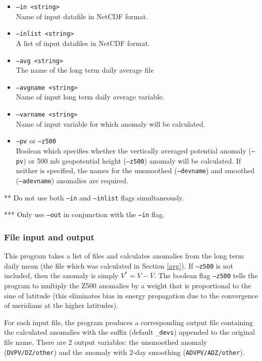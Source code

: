 \documentclass{article}
\begin{document}
\begin{itemize}
\item[]\texttt{--in <string>}\\ Name of input datafile in NetCDF format.
\item[]\texttt{--inlist <string>} \\ A list of input datafiles in NetCDF format. 
\item[] \texttt{--avg <string>}\\ The name of the long term daily average file 
\item[]\texttt{--avgname <string>}\\Name of input long term daily average variable.
\item[] \texttt{--varname <string>}\\Name of input variable for which anomaly will be calculated.
\item[]\texttt{--pv} or \texttt{--z500}\\Boolean which specifies whether the vertically averaged potential anomaly (\texttt{--pv}) or 500 mb geopotential height (\texttt{--z500}) anomaly will be calculated. If neither is specified, the names for the unsmoothed (\texttt{--devname}) and smoothed (\texttt{--adevname}) anomalies are required.
\end{itemize}

** Do not use both \texttt{--in} and \texttt{--inlist} flags simultaneously.

*** Only use \texttt{--out} in conjunction with the \texttt{--in} flag.

\subsubsection{File input and output}
This program takes a list of files and calculates anomalies from the long term daily mean (the file which was calculated in Section \ref{avg}). If \texttt{--z500} is not included, then the anomaly is simply $V^*=V-\overline{V}$. The boolean flag \texttt{--z500} tells the program to multiply the Z500 anomalies by a weight that is proportional to the sine of latitude (this eliminates bias in energy propagation due to the convergence of meridians at the higher latitudes).

For each input file, the program produces a corresponding output file containing the calculated anomalies with the suffix (default \texttt{\_devs}) appended to the original file name. There are 2 output variables: the unsmoothed anomaly (\texttt{DVPV/DZ/other}) and  the anomaly with 2-day smoothing (\texttt{ADVPV/ADZ/other}).
\end{document}
